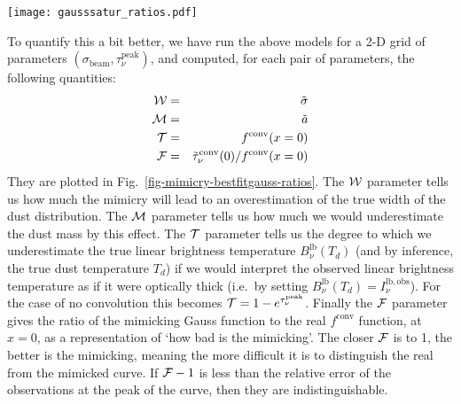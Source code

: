 \documentclass{aa}
\begin{document}
\begin{figure*}
\centerline{\texttt{[image: gausssatur\_ratios.pdf]}}
\caption{\label{fig-mimicry-bestfitgauss-ratios}A quantitative analysis of
  the mimicry effect of Appendix \ref{sec-mimicry-flat-topped}, scanning
  the two parameters of the model: $(\sigma_{\mathrm{beam}},\tau_\nu^{\mathrm{peak}})$.
  The four panels show the four derived parameters explained in the text.
  Upper left shows the degree of overestimation of the width, upper right
  the degree of underestimation of the dust mass, bottom left the underestimation
  of the temperature, bottom right an estimate of the deviation of the Gauss fit
  to the real curve (the closer to unity, the better the mimicry, and therefore
  the worse the interpretation of the observations in terms of an optically thin
  model).
}
\end{figure*}

To quantify this a bit better, we have run the above models for a 2-D grid of
parameters $(\sigma_{\mathrm{beam}},\tau_\nu^{\mathrm{peak}})$, and computed, for
each pair of parameters, the following quantities:
\begin{eqnarray}
  {\cal W} &=& \tilde\sigma \\
  {\cal M} &=& \tilde a \\
  {\cal T} &=& f^{\mathrm{conv}}(x=0)\\
  {\cal F} &=& \tilde \tau_\nu^{\mathrm{conv}}(0)/f^{\mathrm{conv}}(x=0)
\end{eqnarray}
They are plotted in Fig.~\ref{fig-mimicry-bestfitgauss-ratios}. The ${\cal W}$
parameter tells us how much the mimicry will lead to an overestimation of the
true width of the dust distribution. The ${\cal M}$ parameter tells us how much we
would underestimate the dust mass by this effect. The ${\cal T}$ parameter tells
us the degree to which we underestimate the true linear brightness temperature
$B_\nu^{\mathrm{lb}}(T_d)$ (and by inference, the true dust temperature $T_d$)
if we would interpret the observed linear brightness temperature as if it were
optically thick (i.e.~by setting
$B_\nu^{\mathrm{lb}}(T_d)=I_{\nu}^{\mathrm{lb,obs}}$). For the case of no
convolution this becomes ${\cal T}=1-e^{\tau_\nu^{\mathrm{peak}}}$. Finally the
${\cal F}$ parameter gives the ratio of the mimicking Gauss function to the real
$f^{\mathrm{conv}}$ function, at $x=0$, as a representation of `how bad is the
mimicking'. The closer ${\cal F}$ is to 1, the better is the mimicking, meaning
the more difficult it is to distinguish the real from the mimicked curve.
If ${\cal F}-1$ is less than the relative error of the observations at the
peak of the curve, then they are indistinguishable.
\end{document}
